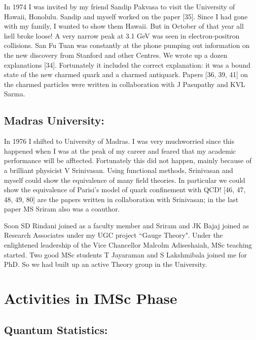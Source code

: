 In 1974 I was invited by my friend Sandip Pakvasa to visit the 
University of Hawaii, Honolulu. Sandip and myself worked on the paper 
[35]. Since I had gone with my family, I wanted to show them Hawaii. But 
in October of that year all hell broke loose! A very narrow peak at 3.1 
GeV was seen in electron-positron collisions. San Fu Tuan was constantly 
at the phone pumping out information on the new discovery from Stanford 
and other Centres. We wrote up a dozen explanations [34]. Fortunately it 
included the correct explanation: it was a bound state of the new 
charmed quark and a charmed antiquark. Papers [36, 39, 41] on the charmed 
particles were written in collaboration with J Pasupathy and KVL Sarma.

\subsection*{Madras University:}

In 1976 I shifted to University of Madras. I was very much\break worried since 
this happened when I was at the peak of my caree\-r and feared that my 
academic performance will be afftected. Fortunately this did not happen, 
mainly because of a brilliant physicist V Srinivasan. Using functional 
methods, Srinivasan and myself could show the equivalence of many field 
theories. In particular we could show the equivalence of Parisi's model 
of quark confinement with QCD! [46, 47, 48, 49, 80] are the papers written 
in collaboration with Srinivasan; in the last paper MS Sriram also was a 
coauthor.

Soon SD Rindani joined as a faculty member and Sriram and JK Bajaj 
joined as Research Associates under my UGC project ``Gauge Theory". Under 
the enlightened leadership of the Vice Chancellor Malcolm Adiseshaiah, 
MSc teaching started. Two good MSc students T Jayaraman and S 
Lakshmibala joined me for PhD. So we had built up an active Theory group 
in the University.

\vspace{-\topsep}
\section*{Activities in IMSc Phase}

\vspace{-\topsep}
\subsection*{Quantum Statistics:}

